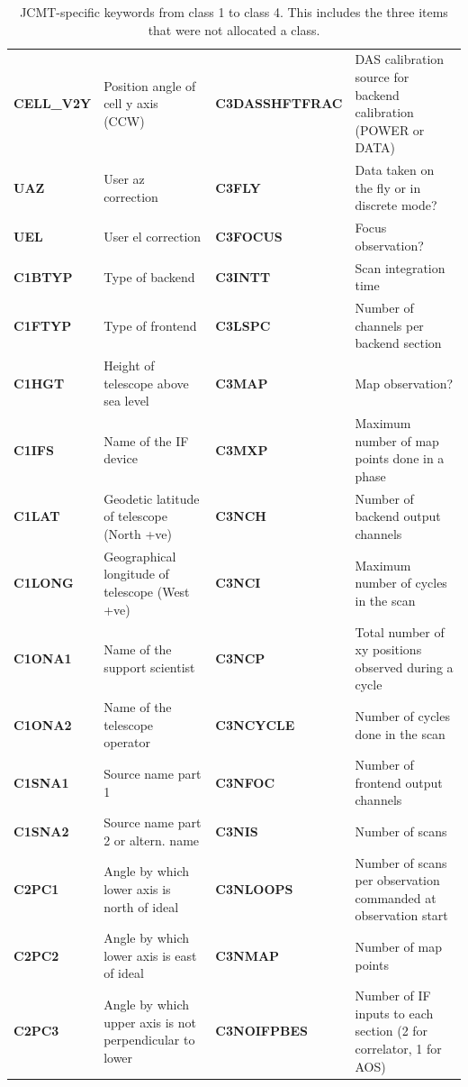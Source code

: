 \documentclass[final,authoryear,5p,times,twocolumn]{elsarticle}
\begin{document}
\begin{table}[!ht]
\caption{JCMT-specific keywords from class 1 to class 4. This includes the three items that were not allocated a class.}
\label{tab:appa1}
\begin{center}
\begin{tabular}{|lp{2.0in}|lp{2.0in}|}
\hline
\textbf{CELL\_V2Y} & Position angle of cell y axis (CCW) & \textbf{C3DASSHFTFRAC} & DAS calibration source for backend calibration (POWER or DATA)\\
\textbf{UAZ} & User az correction & \textbf{C3FLY} & Data taken on the fly or in discrete mode?\\
\textbf{UEL} & User el correction & \textbf{C3FOCUS} & Focus observation?\\
\textbf{C1BTYP} & Type of backend & \textbf{C3INTT} & Scan integration time\\
\textbf{C1FTYP} & Type of frontend & \textbf{C3LSPC} & Number of channels per backend section\\
\textbf{C1HGT} & Height of telescope above sea level & \textbf{C3MAP} & Map observation?\\
\textbf{C1IFS} & Name of the IF device & \textbf{C3MXP} & Maximum number of map points done in a phase\\
\textbf{C1LAT} & Geodetic latitude of telescope (North +ve) & \textbf{C3NCH} & Number of backend output channels\\
\textbf{C1LONG} & Geographical longitude of telescope (West +ve) & \textbf{C3NCI} & Maximum number of cycles in the scan\\
\textbf{C1ONA1} & Name of the support scientist & \textbf{C3NCP} & Total number of xy positions observed during a cycle\\
\textbf{C1ONA2} & Name of the telescope operator & \textbf{C3NCYCLE} & Number of cycles done in the scan\\
\textbf{C1SNA1} & Source name part 1 & \textbf{C3NFOC} & Number of frontend output channels\\
\textbf{C1SNA2} & Source name part 2 or altern. name & \textbf{C3NIS} & Number of scans\\
\textbf{C2PC1} & Angle by which lower axis is north of ideal & \textbf{C3NLOOPS} & Number of scans per observation commanded at observation start\\
\textbf{C2PC2} & Angle by which lower axis is east of ideal & \textbf{C3NMAP} & Number of map points\\
\textbf{C2PC3} & Angle by which upper axis is not perpendicular to lower & \textbf{C3NOIFPBES} & Number of IF inputs to each section (2 for correlator, 1 for AOS)\\

\end{tabular}
\end{center}
\end{table}
\end{document}
